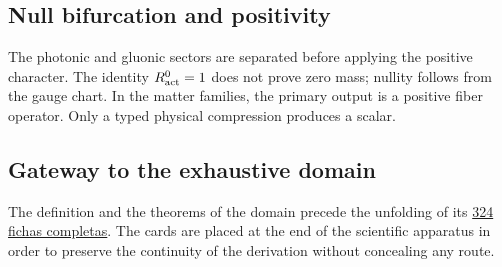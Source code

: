 \begingroup
\let\chapter\section
\let\section\subsection
\let\subsection\subsubsection
\let\subsubsection\paragraph
\let\clearpage\relax

\endgroup

\section{Null bifurcation and positivity}
The photonic and gluonic sectors are separated before applying the positive character.
The identity \(R_{\rm act}^{0}=1\) does not prove zero mass; nullity follows
from the gauge chart. In the matter families, the primary output is a
positive fiber operator. Only a typed physical compression produces a
scalar.

\section{Gateway to the exhaustive domain}
The definition and the theorems of the domain precede the unfolding of its
\hyperref[chap:atlas-genealogico-exhaustivo-324-rutas]{324 fichas completas}.
The cards are placed at the end of the scientific apparatus in order to preserve the
continuity of the derivation without concealing any route.

